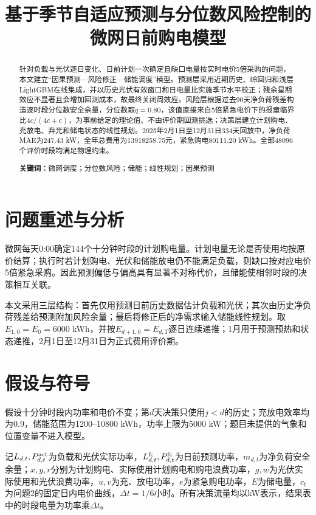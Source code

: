 \documentclass[UTF8,12pt]{ctexart}
\title{基于季节自适应预测与分位数风险控制的微网日前购电模型}
\author{}
\date{}
\begin{document}
\maketitle

\begin{abstract}
针对负载与光伏逐日变化、日前计划一次确定且缺口电量按实时电价5倍采购的问题，本文建立“因果预测—风险修正—储能调度”模型。预测层采用近期历史、岭回归和浅层LightGBM在线集成，并以历史光伏有效窗口和日电量比实施季节水平校正；残余星期效应不显著且会增加回测成本，故最终关闭周效应。风险层根据过去90天净负荷残差构造逐时段分位数安全余量，分位数取$q=0.80$，该值直接来自5倍紧急电价下的报童临界比$4c/(4c+c)$，为事前给定的理论值、不由评价期回测挑选；决策层建立计划购电、充放电、弃光和储电状态的线性规划。2025年2月1日至12月31日334天回放中，净负荷MAE为247.43 kW，全年总费用为13918258.75元，紧急购电80111.20 kWh。全部48096个评价时段均满足物理约束。

\textbf{关键词：}微网调度；分位数风险；储能；线性规划；因果预测
\end{abstract}

\section{问题重述与分析}
微网每天0:00确定144个十分钟时段的计划购电量。计划电量无论是否使用均按原价结算；执行时若计划购电、光伏和储能放电仍不能满足负载，则缺口按对应电价5倍紧急采购。因此预测偏低与偏高具有显著不对称代价，且储能使相邻时段的决策相互关联。

本文采用三层结构：首先仅用预测日前历史数据估计负载和光伏；其次由历史净负荷残差给预测附加风险余量；最后将修正后的净需求输入储能线性规划。取$E_{1,0}=E_0=6000$ kWh，并按$E_{d+1,0}=E_{d,T}$逐日连续递推；1月用于预测预热和状态递推，2月1日至12月31日为正式费用评价期。

\section{假设与符号}
假设十分钟时段内功率和电价不变；第$d$天决策只使用$j<d$的历史；充放电效率均为0.9，储能范围为1200--10800 kWh，功率上限为5000 kW；题目未提供的气象和位置变量不进入模型。

记$L_{d,t},P_{d,t}^{\rm act}$为负载和光伏实际功率，$L_{d,t}^{\rm fc},P_{d,t}^{\rm fc}$为日前预测功率，$m_{d,t}$为净负荷安全余量；$x,y,r$分别为计划购电、实际使用计划购电和购电浪费功率，$g,w$为光伏实际使用和光伏浪费功率，$u,v$为充、放电功率，$e$为紧急购电功率，$E$为储电量，$c_t$为问题2的固定日内电价曲线，$\Delta t=1/6$小时。所有决策流量均以kW表示，结果表中的时段电量为功率乘$\Delta t$。
\end{document}
